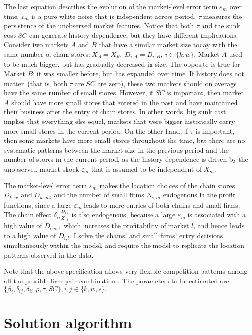 \documentclass[notitlepage,onecolumn,11pt]{article}
\begin{document}
The last equation describes the evolution of the market-level error term $%
\varepsilon _{m}$ over time. $\tilde{\varepsilon}_{m}$ is a pure white noise
that is independent across period. $\tau $ measures the persistence of the
unobserved market features. Notice that both $\tau $ and the sunk cost $SC$
can generate history dependence, but they have different implications.
Consider two markets $A$ and $B$ that have a similar market size today with
the same number of chain stores:$~X_{A}=X_{B},~D_{i,A}=D_{i,B},~i\in
\{k,w\}. $ Market $A$ used to be much bigger, but has gradually decreased in
size. The opposite is true for Market $B$: it was smaller before, but has
expanded over time. If history does not matter\ (that is, both $\tau $ are $%
SC$ are zero), these two markets should on average have the same number of
small stores. However, if $SC$ is important, then market $A$ should have
more small stores that entered in the past and have maintained their
business after the entry of chain stores. In other words, big sunk cost
implies that everything else equal, markets that were bigger historically
carry more small stores in the current period. On the other hand, if $\tau $
is important, then some markets have more small stores throughout the time,
but there are no systematic patterns between the market size in the previous
period and the number of stores in the current period, as the history
dependence is driven by the unobserved market shock $\varepsilon _{m}$ that
is assumed to be independent of $X_{m}.$

The market-level error term $\varepsilon _{m}$ makes the location choices of
the chain stores $D_{k,m}$ and $D_{w,m}$, and the number of small firms $%
N_{s,m}$ endogenous in the profit functions, since a large $\varepsilon _{m}$
leads to more entries of both chains and small firms. The chain effect $%
\delta _{ii}\frac{D_{i,l}}{Z_{ml}}$ is also endogenous, because a large $%
\varepsilon _{m}$ is associated with a high value of $D_{i,m},$ which
increases the profitability of market $l$, and hence leads to a high value
of $D_{i,l}.$ I solve the chains' and small firms' entry decisions
simultaneously within the model, and require the model to replicate the
location patterns observed in the data.

Note that the above specification allows very flexible competition patterns
among all the possible firm-pair combinations. The parameters to be
estimated are $\{\beta _{i},\delta _{ij},\delta _{ii},\rho ,\tau
,SC\},i,j\in \{k,w,s\}.$

\section{Solution algorithm}
\end{document}
